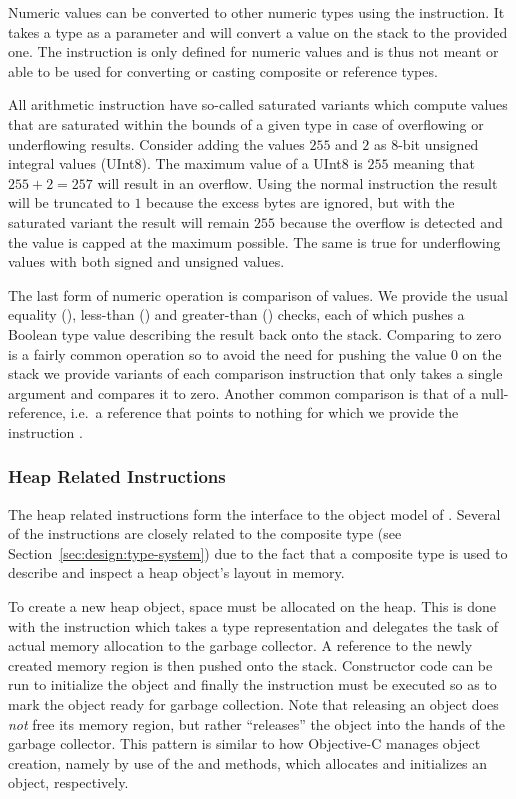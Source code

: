 Numeric values can be converted to other numeric types using the 
instruction. It takes a type as a parameter and will convert a value on the
stack to the provided one. The  instruction is only defined for
numeric values and is thus not meant or able to be used for converting or
casting composite or reference types.

All arithmetic instruction have so-called saturated variants which compute
values that are saturated within the bounds of a given type in case of
overflowing or underflowing results. Consider adding the values $255$ and $2$ as
8-bit unsigned integral values (UInt8). The maximum value of a UInt8 is $255$
meaning that $255+2=257$ will result in an overflow. Using the normal
 instruction the result will be truncated to $1$ because the excess
bytes are ignored, but with the saturated variant the result will remain $255$
because the overflow is detected and the value is capped at the maximum
possible. The same is true for underflowing values with both signed and unsigned
values.

The last form of numeric operation is comparison of values. We provide the usual
equality (), less-than () and
greater-than () checks, each of which pushes a Boolean
type value describing the result back onto the stack. Comparing to zero is a
fairly common operation so to avoid the need for pushing the value $0$ on the
stack we provide variants of each comparison instruction that only takes a
single argument and compares it to zero. Another common comparison is that of a
null-reference, i.e.~a reference that points to nothing for which we provide the
instruction .

\subsubsection{Heap Related Instructions}

The heap related instructions form the interface to the object model of
\thename{}. Several of the instructions are closely related to the composite
type (see Section~\ref{sec:design:type-system}) due to the fact that a composite
type is used to describe and inspect a heap object's layout in memory.

To create a new heap object, space must be allocated on the heap. This is done
with the  instruction which takes a type representation and delegates
the task of actual memory allocation to the garbage collector. A reference to
the newly created memory region is then pushed onto the stack. Constructor code
can be run to initialize the object and finally the  instruction
must be executed so as to mark the object ready for garbage collection. Note
that releasing an object does \emph{not} free its memory region, but rather
``releases'' the object into the hands of the garbage collector. This pattern is
similar to how Objective-C manages object creation, namely by use of the
 and  methods, which allocates and initializes an object,
respectively.


